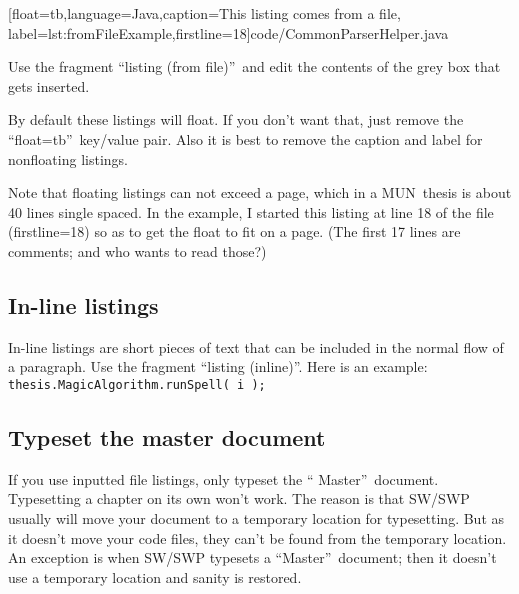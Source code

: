 \begin{singlespaced}%


[float=tb,language=Java,caption={This listing comes from a file}, label=lst:fromFileExample,firstline=18]{code/CommonParserHelper.java}%

\end{singlespaced}%

Use the fragment \textquotedblleft listing (from file)\textquotedblright\
and edit the contents of the grey box that gets inserted.

By default these listings will float. If you don't want that, just remove
the \textquotedblleft float=tb\textquotedblright\ key/value pair. Also it is
best to remove the caption and label for nonfloating listings.

Note that floating listings can not exceed a page, which in a MUN\ thesis is
about 40 lines single spaced. In the example, I started this listing at line
18 of the file (firstline=18) so as to get the float to fit on a page. (The
first 17 lines are comments; and who wants to read those?)

\subsection{In-line listings}

In-line listings are short pieces of text that can be included in the normal
flow of a paragraph. Use the fragment \textquotedblleft listing
(inline)\textquotedblright . Here is an example:\ 
\lstinline[prebreak={},postbreak={}]@thesis.MagicAlgorithm.runSpell( i );@%

\subsection{Typeset the master document}

If you use inputted file listings, only typeset the \textquotedblleft
Master\textquotedblright\ document. Typesetting a chapter on its own won't
work. The reason is that SW/SWP usually will move your document to a
temporary location for typesetting. But as it doesn't move your code files,
they can't be found from the temporary location. An exception is when SW/SWP
typesets a \textquotedblleft Master\textquotedblright\ document; then it
doesn't use a temporary location and sanity is restored.

